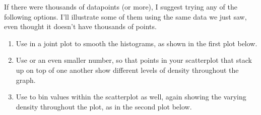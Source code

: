 \documentclass[letterpaper,10pt,english]{sphinxmanual}
\begin{document}
\noindent{}

If there were thousands of datapoints (or more), I suggest trying any of the following options.  I’ll illustrate some of them using the same data we just saw, even thought it doesn’t have thousands of points.
\begin{enumerate}
%
\item {} 
Use  in a joint plot to smooth the histograms, as shown in the first plot below.

\item {} 
Use  or an even smaller number, so that points in your scatterplot that stack up on top of one another show different levels of density throughout the graph.

\item {} 
Use  to bin values within the scatterplot as well, again showing the varying density throughout the plot, as in the second plot below.

\end{enumerate}

\begin{sphinxVerbatim}[commandchars=\\\{\}]
     
\end{sphinxVerbatim}

\noindent{}

\begin{sphinxVerbatim}[commandchars=\\\{\}]
     
\end{sphinxVerbatim}
\end{document}
